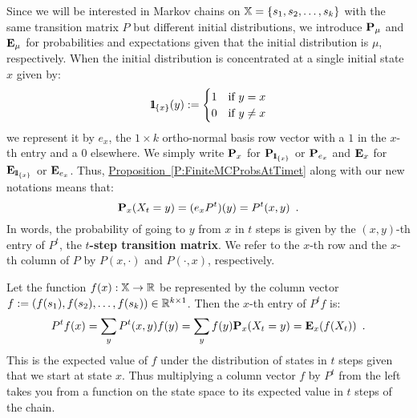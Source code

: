 {Since we will be interested in Markov chains on $\mathbb{X} =\{s_1,s_2,\ldots,s_k\}$ with the same transition matrix $P$ but different initial distributions, we introduce $\mathbf{P}_{\mu}$ and $\mathbf{E}_{\mu}$ for probabilities and expectations  given that the initial distribution is $\mu$, respectively.  When the initial distribution is concentrated at a single initial state $x$ given by:
$${1}\mspace{-11 mu}{1}_{\{x\}}(y) := \begin{cases} 1 & \text{if } y=x\\ 0 & \text{if } y \neq x \end{cases}$$ 
we represent it by $e_x$, the $1 \times k$ ortho-normal basis row vector with a $1$ in the $x$-th entry and a $0$ elsewhere.  
We simply write $\mathbf{P}_x$ for $\mathbf{P}_{{1}\mspace{-11 mu}{1}_{\{x\}}}$ or $\mathbf{P}_{e_x}$ and $\mathbf{E}_x$ for $\mathbf{E}_{{1}\mspace{-11 mu}{1}_{\{x\}}}$ or $\mathbf{E}_{e_x}$.  Thus, \hyperref[P:FiniteMCProbsAtTimet]{Proposition~\ref*{P:FiniteMCProbsAtTimet}} along with our new notations means that:
\[
\mathbf{P}_x (X_t = y)  = (e_x P^t)(y) = P^t(x,y) \enspace .
\]
In words, the probability of going to $y$ from $x$ in $t$ steps is given by the $(x,y)$-th entry of $P^t$, the {\bf $t$-step transition matrix}.  We refer to the $x$-th row and the $x$-th column of $P$ by $P(x,\cdot)$ and $P(\cdot,x)$, respectively.

Let the function $f(x): \mathbb{X}\to \mathbb{R}$ be represented by the column vector $f := (f(s_1),f(s_2),\ldots,f(s_k)) \in \mathbb{R}^{k \times 1}$.  Then the $x$-th entry of $P^t f$ is:
\[
P^t f(x) = \sum_{y} P^t(x,y) f(y) = \sum_{y} f(y) \mathbf{P}_x (X_t = y) = \mathbf{E}_x (f(X_t)) \enspace .
\] 
This is the expected value of $f$ under the distribution of states in $t$ steps given that we start at state $x$.  
Thus multiplying a column vector $f$ by $P^t$ from the left takes you from a function on the state space to its expected value in $t$ steps of the chain. 

}
